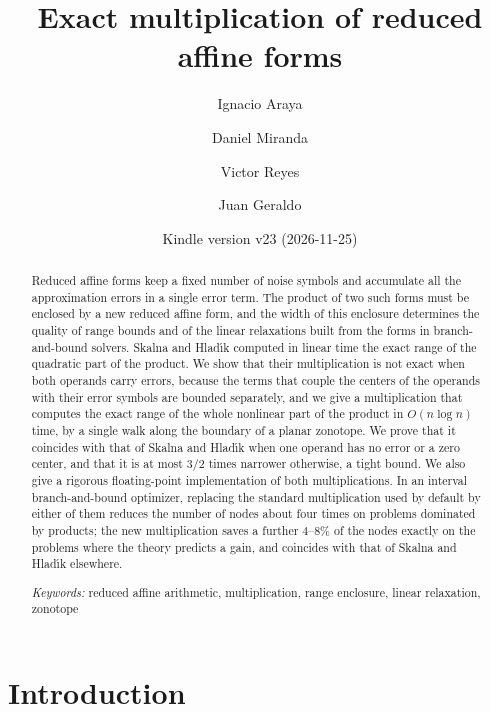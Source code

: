 \documentclass[10pt]{article}
\title{Exact multiplication of reduced affine forms}
\author{Ignacio Araya \and Daniel Miranda \and Victor Reyes \and Juan Geraldo}
\date{\small Kindle version v23 (2026-11-25)}
\theoremstyle{definition}
\begin{document}
\maketitle

\begin{abstract}
Reduced affine forms keep a fixed number of noise symbols and accumulate all the approximation errors in a single error term. The product of two such forms must be enclosed by a new reduced affine form, and the width of this enclosure determines the quality of range bounds and of the linear relaxations built from the forms in branch-and-bound solvers. Skalna and Hlad\'{\i}k computed in linear time the exact range of the quadratic part of the product. We show that their multiplication is not exact when both operands carry errors, because the terms that couple the centers of the operands with their error symbols are bounded separately, and we give a multiplication that computes the exact range of the whole nonlinear part of the product in $O(n\log n)$ time, by a single walk along the boundary of a planar zonotope. We prove that it coincides with that of Skalna and Hlad\'{\i}k when one operand has no error or a zero center, and that it is at most $3/2$ times narrower otherwise, a tight bound. We also give a rigorous floating-point implementation of both multiplications. In an interval branch-and-bound optimizer, replacing the standard multiplication used by default by either of them reduces the number of nodes about four times on problems dominated by products; the new multiplication saves a further 4--8\% of the nodes exactly on the problems where the theory predicts a gain, and coincides with that of Skalna and Hlad\'{\i}k elsewhere.

\medskip\noindent
\textit{Keywords:} reduced affine arithmetic, multiplication, range enclosure, linear relaxation, zonotope
\end{abstract}

\section{Introduction}
\end{document}
